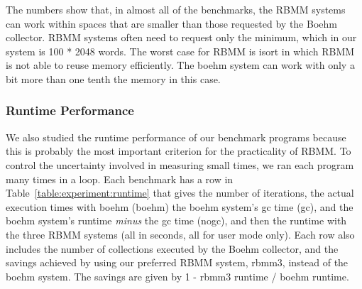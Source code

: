 \documentclass{tlp}
\newcommand{\bench}[1]{{#1}}
\begin{document}
The numbers show that, in almost all of the benchmarks,
the RBMM systems can work within spaces
that are smaller than those requested by the Boehm collector.
RBMM systems often need to request only the minimum,
which in our system is 100 * 2048 words.
The worst case for RBMM is \bench{isort}
in which RBMM is not able to reuse memory efficiently.
The boehm system can work with
only a bit more than one tenth the memory in this case.

\subsubsection{Runtime Performance}
\label{seCevalCruntime}

We also studied the runtime performance of our benchmark programs
because this is probably the most important criterion
for the practicality of RBMM.
To control the uncertainty involved in measuring small times,
we ran each program many times in a loop.
Each benchmark has a row in Table~\ref{table:experiment:runtime}
that gives the number of iterations,
the actual execution times with boehm (boehm)
the boehm system's gc time (gc),
and the boehm system's runtime \emph{minus} the gc time (nogc),
and then the runtime with the three RBMM systems
(all in seconds, all for user mode only).
Each row also includes
the number of collections executed by the Boehm collector,
and the savings achieved by using our preferred RBMM system, rbmm3,
instead of the boehm system.
The savings are given by 1 - rbmm3 runtime / boehm runtime.
\end{document}
